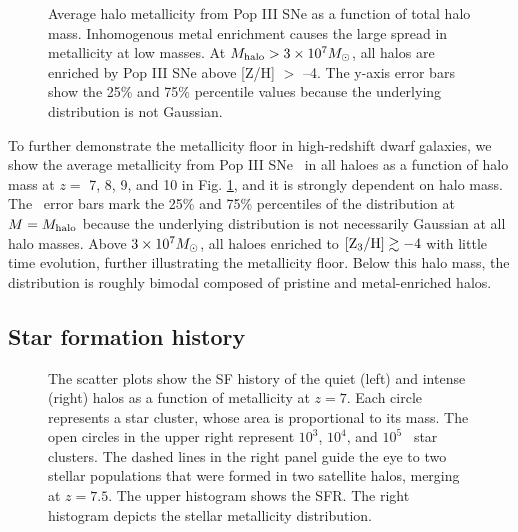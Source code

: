 \documentclass[apjl]{emulateapj}
\begin{document}

\begin{figure}
\caption{\label{fig:z3} Average halo metallicity from Pop III SNe as a
  function of total halo mass.  Inhomogenous metal enrichment causes
  the large spread in metallicity at low masses.  At $M_{\rm halo} > 3
  \times 10^7 \Ms$, all halos are enriched by Pop III SNe above [Z/H]
  $>$ --4.  The y-axis error bars show the 25\% and 75\% percentile
  values because the underlying distribution is not Gaussian.}
\end{figure}


To further demonstrate the metallicity floor in high-redshift dwarf
galaxies, we show the average metallicity from Pop III SNe \zthree~in
all haloes as a function of halo mass at $z =$ 7, 8, 9, and 10 in
Fig. \ref{fig:z3}, and it is strongly dependent on halo mass.  The
\zthree~error bars mark the 25\% and 75\% percentiles of the
distribution at $M = M_{\rm halo}$ because the underlying distribution
is not necessarily Gaussian at all halo masses.  Above $3 \times 10^7
\Ms$, all haloes enriched to $\zthree \ga -4$ with little time
evolution, further illustrating the metallicity floor.  Below this
halo mass, the distribution is roughly bimodal composed of pristine
and metal-enriched halos.

\subsection{Star formation history}
\label{sec:pop}


\begin{figure*}
\caption{\label{fig:pops} The scatter plots show the SF history of the
  quiet (left) and intense (right) halos as a function of metallicity
  at $z=7$.  Each circle represents a star cluster, whose area is
  proportional to its mass.  The open circles in the upper right
  represent $10^3$, $10^4$, and $10^5$ \Ms~star clusters.  The dashed
  lines in the right panel guide the eye to two stellar populations
  that were formed in two satellite halos, merging at $z=7.5$.  The
  upper histogram shows the SFR.  The right histogram depicts the
  stellar metallicity distribution.}
\end{figure*}
\end{document}
